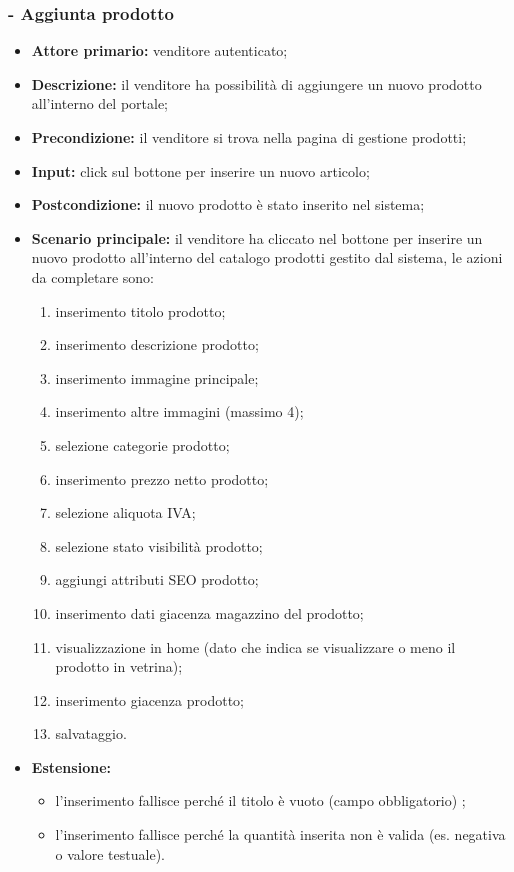 \subsubsection{- Aggiunta prodotto}
\begin{itemize}
    \item \textbf{Attore primario:} venditore autenticato;
    \item \textbf{Descrizione:} il venditore ha possibilità di aggiungere un nuovo prodotto all’interno del portale;
    \item \textbf{Precondizione:} il venditore si trova nella pagina di gestione prodotti;
    \item \textbf{Input:} click sul bottone per inserire un nuovo articolo;
    \item \textbf{Postcondizione:} il nuovo prodotto è stato inserito nel sistema;
    \item \textbf{Scenario principale:} il venditore ha cliccato nel bottone per inserire un nuovo prodotto all’interno del catalogo prodotti gestito dal sistema, le azioni da completare sono:
          \begin{enumerate}
              \item inserimento titolo prodotto;
              \item inserimento descrizione prodotto;
              \item inserimento immagine principale;
              \item inserimento altre immagini (massimo 4);
              \item selezione categorie prodotto;
              \item inserimento prezzo netto prodotto;
              \item selezione aliquota IVA;
              \item selezione stato visibilità prodotto;
              \item aggiungi attributi SEO prodotto;
              \item inserimento dati giacenza magazzino del prodotto;
              \item visualizzazione in home (dato che indica se visualizzare o meno il prodotto in vetrina);
              \item inserimento giacenza prodotto;
              \item salvataggio.
          \end{enumerate}
    \item \textbf{Estensione:}
          \begin{itemize}
              \item l'inserimento fallisce perché il titolo è vuoto (campo obbligatorio) ;
              \item l'inserimento fallisce perché la quantità inserita non è valida (es. negativa o valore testuale).
          \end{itemize}
\end{itemize}

